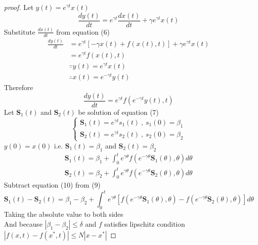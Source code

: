 \documentclass[]{article}
\begin{document}
\begin{proof}[proof]

    Let $ y(t) = e^{\gamma t} x(t) $
    \[
        \frac{dy(t)}{dt}  = e^{\gamma t}\frac{dx(t)}{dt} + \gamma e^{\gamma t}x(t)
    \]
    Substitute $\displaystyle \frac{dx(t)}{dt}$ from equation (6)
    \begin{align*}
        \frac{dy(t)}{dt} & = e^{\gamma t}\left[-\gamma x(t) + f(x(t),t)\right] + \gamma e^{\gamma t}x(t)
        \\
                         & = e^{\gamma t}f(x(t),t)
        \\
                         & \because y(t) = e^{\gamma t} x(t)
        \\
                         & \therefore x(t) = e^{-\gamma t}y(t)
    \end{align*}
    Therefore
    \begin{equation}
        \frac{dy(t)}{dt} = e^{\gamma t}f(e^{-\gamma t}y(t),t)
    \end{equation}
    Let $\mathbf{S}_1(t)$ and $\mathbf{S}_2(t)$ be solution of equation (7)
    \begin{equation}
        \begin{cases}
            \displaystyle \mathbf{S}_1(t) = e^{\gamma t}s_1(t) \ , \  s_1(0) = \beta_1
            \\
            \displaystyle \mathbf{S}_2(t) = e^{\gamma t}s_2(t) \ , \  s_2(0) = \beta_2
        \end{cases}
    \end{equation}
    $y(0) = x(0)$ i.e. $\mathbf{S}_1(t) = \beta_1 $ and $\mathbf{S}_2(t) = \beta_2$
    \begin{align}
        \mathbf{S}_1(t) = \beta_1 + \int_{0}^{t}e^{\gamma \theta}f(e^{-\gamma \theta}\mathbf{S}_1(\theta),\theta)d\theta
        \\
        \mathbf{S}_2(t) = \beta_2 + \int_{0}^{t}e^{\gamma \theta}f(e^{-\gamma \theta}\mathbf{S}_2(\theta),\theta)d\theta
    \end{align}
    Subtract equation (10) from (9)
    \[
        \mathbf{S}_1(t) - \mathbf{S}_2(t) = \beta_1 - \beta_2 + \int_{0}^{t} e^{\gamma \theta}\left[ f(e^{-\gamma \theta}\mathbf{S}_1(\theta),\theta) - f(e^{-\gamma \theta}\mathbf{S}_2(\theta),\theta)\right]d\theta
    \]
    Taking the absolute value to both sides
    \\
    And because $\left\lvert \beta_1 - \beta_2 \right\rvert \leq \delta $
    and $f$ satisfies lipschitz condition $\left\lvert f(x,t) - f(x^*,t)\right\rvert \leq N\left\lvert x - x^*\right\rvert$

\end{proof}
\end{document}
